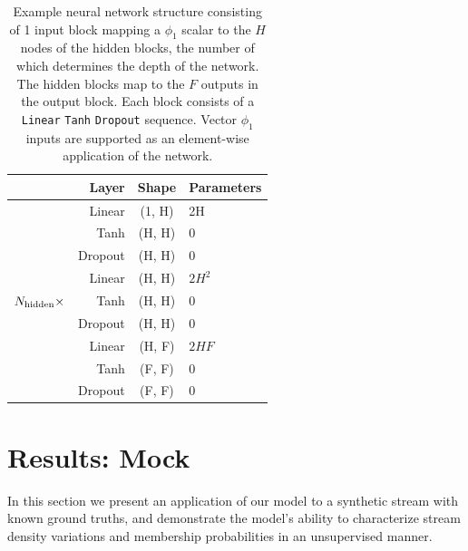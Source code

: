 \documentclass[twocolumn]{aastex631}
\begin{document}
        \begin{table}
            \centering
            \caption{
            Example neural network structure consisting of 1 input block mapping a $\phi_1$ scalar to the $H$ nodes of the hidden blocks, the number of which determines the depth of the network. The hidden blocks map to the $F$ outputs in the output block. Each block consists of a \texttt{Linear} \!\!\textrightarrow \texttt{Tanh} \!\!\textrightarrow \texttt{Dropout} sequence. Vector $\phi_1$ inputs are supported as an element-wise application of the network.
            }
            \label{table:mlp_structure}
            \begin{tabular}{@{}rrcl@{}}
            \toprule
            & Layer & Shape & Parameters \\
            \midrule
            & Linear & (1, H) & 2H  \\
            & Tanh & (H, H) & 0  \\
            & Dropout & (H, H) & 0  \\
            \hline
            & Linear & (H, H) & $2H^2$  \\
            $N_{\rm hidden} \times$ & Tanh & (H, H) & 0  \\
            & Dropout & (H, H) & 0  \\
            \hline
            & Linear & (H, F) & $2HF$  \\
            & Tanh & (F, F) & 0 \\
            & Dropout & (F, F) & 0  \\
            \bottomrule
            \end{tabular}
        \end{table}

        

\section{Results: Mock} \label{sec:results_mock}

    In this section we present an application of our model to a synthetic stream with known ground truths, and demonstrate the model's ability to characterize stream density variations and membership probabilities in an unsupervised manner.

    
\end{document}
